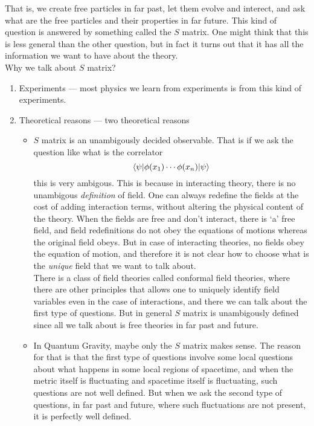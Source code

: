 \documentclass[11pt]{article}
\numberwithin{equation}{section}
\begin{document}
    That is, we create free particles in far past, let them evolve and interect, and ask what are the free particles and their properties in far future. This kind of question is answered by something called the \(S\) matrix. One might think that this is less general than the other question, but in fact it turns out that it has all the information we want to have about the theory. \\

    Why we talk about \(S\) matrix?
    \begin{enumerate}
        \item Experiments — most physics we learn from experiments is from this kind of experiments. 
        \item Theoretical reasons — two theoretical reasons \begin{itemize}
            \item \(S\) matrix is an unambigously decided observable. That is if we ask the question like what is the correlator 
            \begin{equation*}
                \braket{\psi | \phi(x_1) \cdots \phi(x_n)| \psi}
            \end{equation*}
            this is very ambigous. This is because in interacting theory, there is no unambigous \textit{definition} of field. One can always redefine the fields at the cost of adding interaction terms, without altering the physical content of the theory. When the fields are free and don't interact, there is `a' free field, and field redefinitions do not obey the equations of motions whereas the original field obeys. But in case of interacting theories, no fields obey the equation of motion, and therefore it is not clear how to choose what is the \textit{unique} field that we want to talk about.\\
            There is a class of field theories called conformal field theories, where there are other principles that allows one to uniquely identify field variables even in the case of interactions, and there we can talk about the first type of questions. But in general \(S\) matrix is unambigously defined since all we talk about is free theories in far past and future.
            \item In Quantum Gravity, maybe only the \(S\) matrix makes sense. The reason for that is that the first type of questions involve some local questions about what happens in some local regions of spacetime, and when the metric itself is fluctuating and spacetime itself is fluctuating, such questions are not well defined. But when we ask the second type of questions, in far past and future, where such fluctuations are not present, it is perfectly well defined. 
        \end{itemize}
    \end{enumerate}
\end{document}
